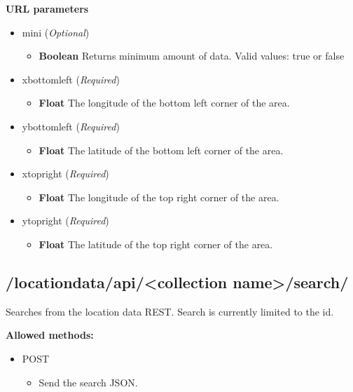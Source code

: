 \documentclass[letterpaper,10pt,english]{sphinxmanual}
\begin{document}
\textbf{URL parameters}
\begin{itemize}
\item {} 
mini (\emph{Optional})
\begin{itemize}
\item {} 
\textbf{Boolean} Returns minimum amount of data. Valid values: true or false

\end{itemize}

\item {} 
xbottomleft (\emph{Required})
\begin{itemize}
\item {} 
\textbf{Float} The longitude of the bottom left corner of the area.

\end{itemize}

\item {} 
ybottomleft (\emph{Required})
\begin{itemize}
\item {} 
\textbf{Float} The latitude of the bottom left corner of the area.

\end{itemize}

\item {} 
xtopright (\emph{Required})
\begin{itemize}
\item {} 
\textbf{Float} The longitude of the top right corner of the area.

\end{itemize}

\item {} 
ytopright (\emph{Required})
\begin{itemize}
\item {} 
\textbf{Float} The latitude of the top right corner of the area.

\end{itemize}

\end{itemize}


\subsection{/locationdata/api/\textless{}collection name\textgreater{}/search/}
\label{restdoc:locationdata-api-collection-name-search}
Searches from the location data REST. Search is currently limited to the id.

\textbf{Allowed methods:}
\begin{itemize}
\item {} 
POST
\begin{itemize}
\item {} 
Send the search JSON.

\end{itemize}

\end{itemize}
\end{document}
